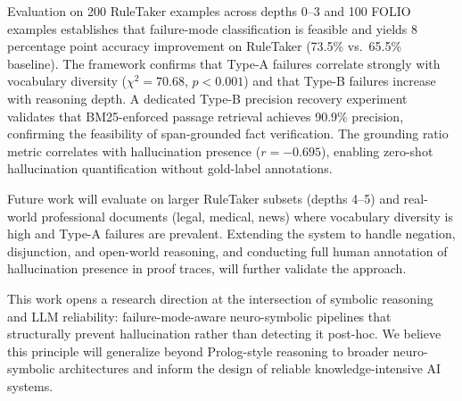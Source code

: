 \documentclass[11pt,letterpaper]{article}
\begin{document}
Evaluation on 200 RuleTaker examples across depths 0--3 and 100 FOLIO examples establishes that failure-mode classification is feasible and yields 8 percentage point accuracy improvement on RuleTaker (73.5\% vs.\ 65.5\% baseline). The framework confirms that Type-A failures correlate strongly with vocabulary diversity ($\chi^2 = 70.68$, $p{<}0.001$) and that Type-B failures increase with reasoning depth. A dedicated Type-B precision recovery experiment validates that BM25-enforced passage retrieval achieves 90.9\% precision, confirming the feasibility of span-grounded fact verification. The grounding ratio metric correlates with hallucination presence ($r = -0.695$), enabling zero-shot hallucination quantification without gold-label annotations.

Future work will evaluate on larger RuleTaker subsets (depths 4--5) and real-world professional documents (legal, medical, news) where vocabulary diversity is high and Type-A failures are prevalent. Extending the system to handle negation, disjunction, and open-world reasoning, and conducting full human annotation of hallucination presence in proof traces, will further validate the approach.

This work opens a research direction at the intersection of symbolic reasoning and LLM reliability: failure-mode-aware neuro-symbolic pipelines that structurally prevent hallucination rather than detecting it post-hoc. We believe this principle will generalize beyond Prolog-style reasoning to broader neuro-symbolic architectures and inform the design of reliable knowledge-intensive AI systems.



\end{document}
